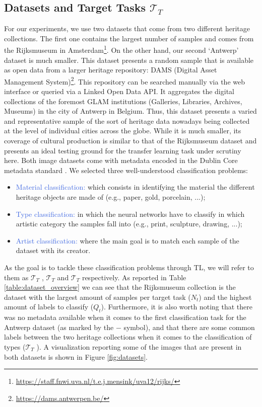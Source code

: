 \subsection{Datasets and Target Tasks $\mathcal{T}_T$}
\label{subsec:datasets}

For our experiments, we use two datasets that come from two different heritage collections. The first one contains the largest number of samples and comes from the Rijksmuseum in Amsterdam\footnote{\url{https://staff.fnwi.uva.nl/t.e.j.mensink/uva12/rijks/}}. On the other hand, our second `Antwerp' dataset is much smaller. This dataset presents a random sample that is available as open data from a larger heritage repository: DAMS (Digital Asset Management System)\footnote{\url{https://dams.antwerpen.be/}}. This repository can be searched manually via the web interface or queried via a Linked Open Data API. It aggregates the digital collections of the foremost GLAM institutions  (Galleries, Libraries, Archives, Museums) in the city of Antwerp in Belgium. Thus, this dataset presents a varied and representative sample of the sort of heritage data nowadays being collected at the level of individual cities across the globe. While it is much smaller, its coverage of cultural production is similar to that of the Rijksmuseum dataset and presents an ideal testing ground for the transfer learning task under scrutiny here. Both image datasets come with metadata encoded in the Dublin Core metadata standard \cite{weibel1998dublin}. We selected three well-understood classification problems:
\begin{itemize}
	\item \textcolor{RoyalBlue}{Material classification:} which consists in identifying the material the different heritage objects are made of (e.g., paper, gold, porcelain, ...); 
	\item \textcolor{RoyalBlue}{Type classification:} in which the neural networks have to classify in which artistic category the samples fall into (e.g., print, sculpture, drawing, ...);
	\item \textcolor{RoyalBlue}{Artist classification:} where the main goal is to match each sample of the dataset with its creator.
\end{itemize}

As the goal is to tackle these classification problems through TL, we will refer to them as $\mathcal{T}_T$ , $\mathcal{T}_T$  and $\mathcal{T}_T$  respectively. As reported in Table \ref{table:dataset_overview} we can see that the Rijksmuseum collection is the dataset with the largest amount of samples per target task ($N_t$) and the highest amount of labels to classify ($Q_t$). Furthermore, it is also worth noting that there was no metadata available when it comes to the first classification task for the Antwerp dataset (as marked by the $-$ symbol), and that there are some common labels between the two heritage collections when it comes to the classification of types ($\mathcal{T}_T$ ). A visualization reporting some of the images that are present in both datasets is shown in Figure \ref{fig:datasets}.



